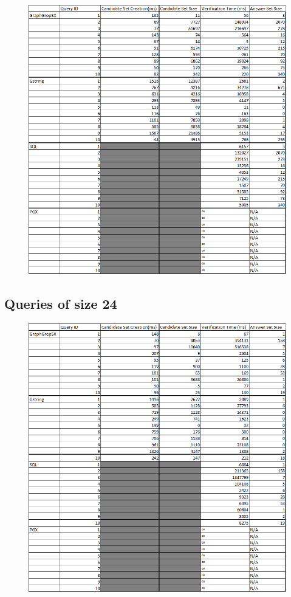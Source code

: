 \documentclass[12pt,a4paper]{report}
\let\openright=\clearpage
\begin{document}
\begin{figure}[h]
	\centering
	\includegraphics[width=1\textwidth]{../img/q16.png}
\end{figure}

\newpage
\subsection*{Queries of size 24}

\begin{figure}[h]
	\centering
	\includegraphics[width=1\textwidth]{../img/q24.png}
\end{figure}

\openright
\end{document}
